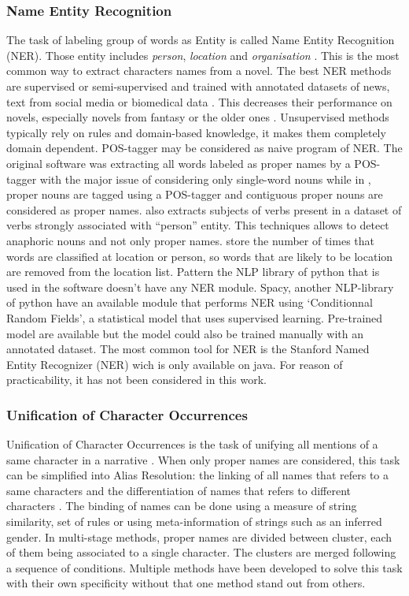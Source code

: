 \documentclass[a4paper, 12pt]{report}
\begin{document}
\subsubsection{Name Entity Recognition}
The task of labeling group of words as Entity is called Name Entity Recognition (NER). 
Those entity includes \textit{person}, \textit{location} and \textit{organisation} \citep{libraries}. 
This is the most common way to extract characters names from a novel.
The best NER methods are supervised or semi-supervised and trained with annotated datasets of news, text from social media or biomedical data \citep{NER_survey_recent}.
This decreases their performance on novels, especially novels from fantasy or the older ones \citep{NER}.
Unsupervised methods typically rely on rules and domain-based knowledge, it makes them completely domain dependent.
POS-tagger may be considered as naive program of NER.
The original software \citep{original} was extracting all words labeled as proper names by a POS-tagger with the major issue of considering only single-word nouns 
while in \cite{quoted}, proper nouns are tagged using a POS-tagger and contiguous proper nouns are considered as proper names. 
\cite{character_meta} also extracts subjects of verbs present in a dataset of verbs strongly associated with ``person'' entity. 
This techniques allows to detect anaphoric nouns and not only proper names. \cite{ structure_clustering} store the number of times that words are classified at location or person, 
so words that are likely to be location are removed from the location list.
Pattern the NLP  library of python that is used in the software doesn't have any NER module.
Spacy, another NLP-library of python have an available module that performs NER using `Conditionnal Random Fields', a statistical model that uses supervised learning. 
Pre-trained model are available but the model could also be trained manually with an annotated dataset.  
The most common tool for NER is the Stanford Named Entity Recognizer (NER) wich is only available on java. For reason of practicability, it has not been considered in this work.\\


\subsubsection{Unification of Character Occurrences}
Unification of Character Occurrences is the task of unifying all mentions of a same character in a narrative \citep{fiction}. 
When only proper names are considered, this task can be simplified into Alias Resolution: 
the linking of all names that refers to a same characters and the differentiation of names that refers to different characters \citep{book_social}.
The binding of names can be done using a measure of string similarity, set of rules or using meta-information of strings such as an inferred gender. 
In multi-stage methods, proper names are divided between cluster, each of them being associated to a single character. The clusters are merged following a sequence of conditions.
Multiple methods have been developed to solve this task with their own specificity without that one method stand out from others.\\
\end{document}
